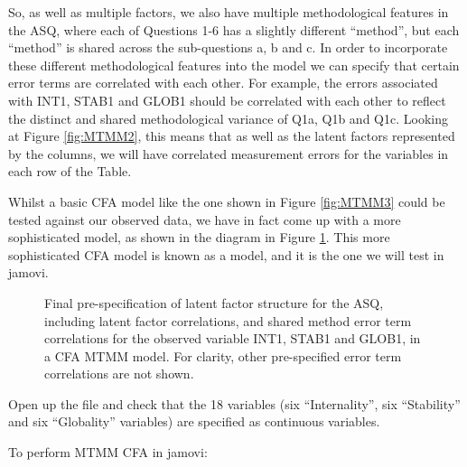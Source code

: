 So, as well as multiple factors, we also have multiple methodological features in the ASQ, where each of Questions 1-6 has a slightly different “method”, but each “method” is shared across the sub-questions a, b and c. In order to incorporate these different methodological features into the model we can specify that certain error terms are correlated with each other. For example, the errors associated with INT1, STAB1 and GLOB1 should be correlated with each other to reflect the distinct and shared methodological variance of Q1a, Q1b and Q1c. Looking at Figure \ref{fig:MTMM2}, this means that as well as the latent factors represented by the columns, we will have correlated measurement errors for the variables in each row of the Table. 

Whilst a basic CFA model like the one shown in Figure \ref{fig:MTMM3} could be tested against our observed data, we have in fact come up with a more sophisticated model, as shown in the diagram in Figure \ref{fig:MTMM4}. This more sophisticated CFA model is known as a  model, and it is the one we will test in jamovi.

\begin{figure}[p]
\begin{center}
\caption{Final pre-specification of latent factor structure for the ASQ, including latent factor correlations, and shared method error term correlations for the observed variable INT1, STAB1 and GLOB1, in a CFA MTMM model. For clarity, other pre-specified error term correlations are not shown.}
\label{fig:MTMM4}
\HR
\end{center}
\end{figure}


Open up the  file and check that the 18 variables (six “Internality”, six “Stability” and six “Globality” variables) are specified as continuous variables. 

To perform MTMM CFA in jamovi:

